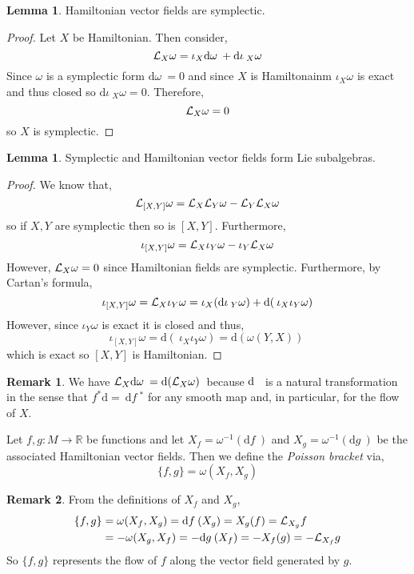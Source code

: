 \documentclass[12pt]{extarticle}
\newcommand{\R}{\mathbb{R}}
\renewcommand{\d}[1]{ \mathrm{d}#1 \:}
\theoremstyle{definition}
\newtheorem{lemma}[theorem]{Lemma}
\newtheorem{remark}{Remark}
\newenvironment{definition}[1][Definition:]{\begin{trivlist}
\item[\hskip \labelsep {\bfseries #1}]}{\end{trivlist}}
\begin{document}
\begin{lemma}
Hamiltonian vector fields are symplectic.
\end{lemma}

\begin{proof}
Let $X$ be Hamiltonian. Then consider,
\[ \L_X \omega = \iota_X \d \omega + \d \iota_X \omega \]
Since $\omega$ is a symplectic form $\d{\omega} = 0$ and since $X$ is Hamiltonainm $\iota_X \omega$ is exact and thus closed so $\d \iota_X \omega = 0$. Therefore,
\[ \mathcal{L}_X \omega = 0 \]
so $X$ is symplectic.
\end{proof}

\begin{lemma}
Symplectic and Hamiltonian vector fields form Lie subalgebras.
\end{lemma}

\begin{proof}
We know that,
\[ \mathcal{L}_{[X,Y]} \omega = \mathcal{L}_X \mathcal{L}_Y \omega - \mathcal{L}_Y \mathcal{L}_X \omega \]
so if $X,Y$ are symplectic then so is $[X, Y]$. Furthermore, 
\[ \iota_{[X, Y]} \omega = \mathcal{L}_X \iota_Y \omega - \iota_Y \mathcal{L}_X \omega \]
However, $\mathcal{L}_X \omega = 0$ since Hamiltonian fields are symplectic. Furthermore, by Cartan's formula,
\[ \iota_{[X, Y]} \omega = \L_X \iota_Y \omega = \iota_X (\d \iota_Y \omega) + \d( \iota_X \iota_Y \omega) \]
However, since $\iota_Y \omega$ is exact it is closed and thus,
\[ \iota_{[X, Y]} \omega = \d (\iota_X \iota_Y \omega) = \d{(\omega(Y, X))} \]
which is exact so $[X, Y]$ is Hamiltonian. 
\end{proof}

\begin{remark}
We have $\L_X \d{\omega} = \d{(\L_X \omega)}$ because $\d$ is a natural transformation in the sense that $f^* \d = \d f^*$ for any smooth map and, in particular, for the flow of $X$. 
\end{remark}

\begin{definition}
Let $f, g : M \to \R$ be functions and let $X_f = \omega^{-1}(\d{f})$ and $X_g = \omega^{-1}(\d{g})$ be the associated Hamiltonian vector fields. Then we define the \textit{Poisson bracket} via,
\[ \{ f, g \} = \omega(X_f, X_g) \] 
\end{definition}

\begin{remark}
From the definitions of $X_f$ and $X_g$,
\begin{align*}
\{ f, g \} & = \omega(X_f, X_g) = \d{f}(X_g) = X_g(f) = \L_{X_g} f
\\
& = - \omega(X_g, X_f) = -\d{g}(X_f) = - X_f(g) = - \L_{X_f} g
\end{align*}
So $\{ f, g \}$ represents the flow of $f$ along the vector field generated by $g$. 
\end{remark}
\end{document}
